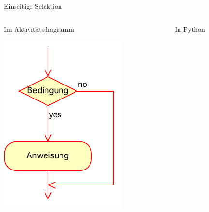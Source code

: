 \documentclass[xelatex,aspectratio=169]{beamer}
\begin{document}
\begin{frame}{Einseitige Selektion}
\begin{columns}[t]
\begin{column}{.3\linewidth}
\begin{block}{Im Aktivitätsdiagramm}
\begin{minipage}[c][.7\textheight][c]{\textwidth}
          \includegraphics[width=\textwidth]{fig/algorithmus_einseitige_selektion_aktivitaetsdiagram.drawio.pdf}
        \end{minipage}
      \end{block}
    \end{column}
    \begin{column}{.3\linewidth}
      \begin{block}{In Python}
        \begin{minipage}[c][.7\textheight][c]{\textwidth}
          \inputminted{python}{src/algorithmus_einseitige_selektion.py}
        \end{minipage}
      \end{block}
    \end{column}
  \end{columns}

\end{frame}
\end{document}
